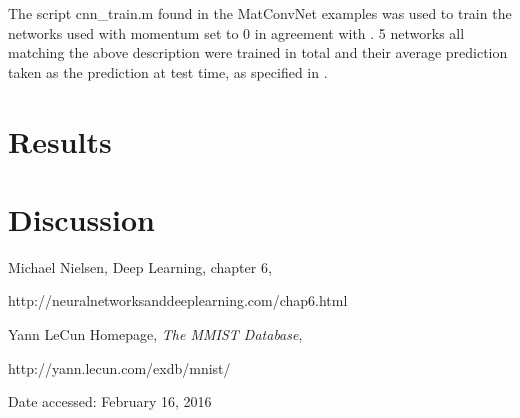 \documentclass[a4paper,12pt]{article}
\begin{document}
The script cnn\_train.m found in the MatConvNet examples was used to train the networks used with momentum set to 0 in agreement with \cite{SRC}. 5 networks all matching the above description were trained in total and their average prediction taken as the prediction at test time, as specified in \cite{SRC}.

\section{Results}


\section{Discussion}


\begin{thebibliography}{10}

Michael Nielsen, Deep Learning, chapter 6,

http://neuralnetworksanddeeplearning.com/chap6.html

Yann LeCun Homepage, \textit{The MMIST Database},

http://yann.lecun.com/exdb/mnist/

Date accessed: February 16, 2016




\end{thebibliography}
\end{document}
